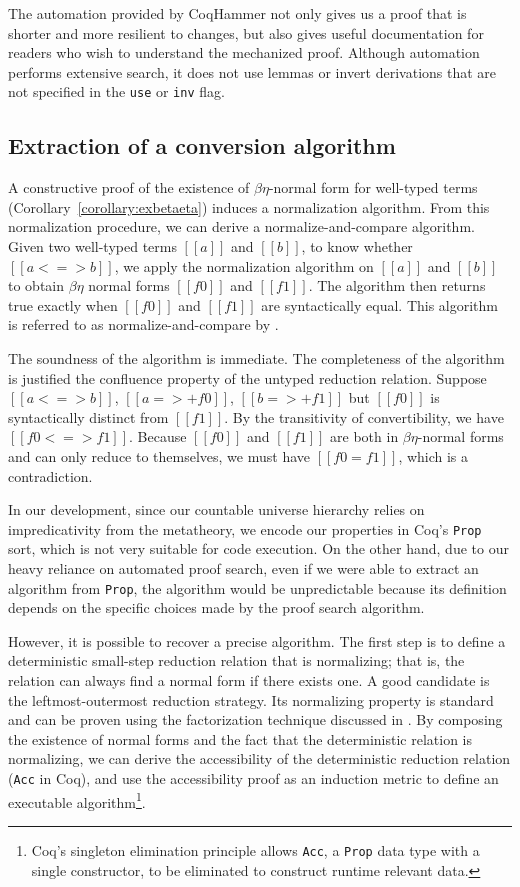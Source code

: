 \documentclass[acmsmall,screen=true,
\ifpublic review=false\else,review=true\fi
  ,anonymous=\ifanonymous true\else false\fi]{acmart}
\begin{document}
The automation provided by CoqHammer not only gives us a proof that is shorter
and more resilient to changes, but also gives useful documentation for readers
who wish to understand the mechanized proof. Although automation performs
extensive search, it does not use lemmas or invert derivations that are not
specified in the \texttt{use} or \texttt{inv} flag.

\subsection{Extraction of a conversion algorithm}
\label{sec:conversionalgo}
A constructive proof of the existence of $\beta\eta$-normal form
for well-typed terms (Corollary~\ref{corollary:exbetaeta}) induces a
normalization algorithm. From this normalization procedure, we can
derive a normalize-and-compare algorithm. Given two well-typed terms
$[[a]]$ and $[[b]]$, to know whether $[[a <=> b]]$, we apply the
normalization algorithm on $[[a]]$ and $[[b]]$ to obtain $\beta\eta$
normal forms $[[f0]]$ and $[[f1]]$. The algorithm then returns true
exactly when $[[f0]]$ and $[[f1]]$ are syntactically equal. This
algorithm is referred to as normalize-and-compare by
\citet{pierce2004advanced}.

The soundness of the algorithm is immediate. The completeness of the
algorithm is justified the confluence property of the untyped
reduction relation. Suppose $[[a <=> b]]$, $[[a =>+ f0]]$, $[[b =>+
f1]]$ but $[[f0]]$ is syntactically distinct from $[[f1]]$. By the transitivity of convertibility, we have $[[f0 <=> f1]]$.
Because $[[f0]]$ and $[[f1]]$ are both in
$\beta\eta$-normal forms and can only reduce to themselves, we must
have $[[f0 = f1]]$, which is a contradiction.

In our development, since our countable universe hierarchy
relies on impredicativity from the metatheory, we encode our
properties in Coq's \texttt{Prop} sort, which is not very suitable for
code execution. On the other hand, due to our heavy reliance on
automated proof search, even if we were able to extract an algorithm from \texttt{Prop},
the algorithm would be unpredictable because its definition depends on
the specific choices made by the proof search algorithm.

However, %
it is possible to recover a
precise algorithm. The first step is to define a deterministic
small-step reduction relation that is normalizing; that is, the
relation can always find a normal form if there exists one. A good
candidate is the leftmost-outermost reduction strategy. Its
normalizing property is standard and can be proven using the
factorization technique discussed in
\citet{takahashi-parallel-reduction, factorization-essentially}. By
composing the existence of normal forms and the fact that the
deterministic relation is normalizing, we can derive the
accessibility of the deterministic reduction relation
(\texttt{Acc} in Coq), and use the accessibility proof as
an induction metric to define an executable algorithm\footnote{Coq's
  singleton elimination principle allows \texttt{Acc}, a
  \texttt{Prop} data type with a single constructor, to be eliminated
  to construct runtime relevant data.}.
\end{document}
